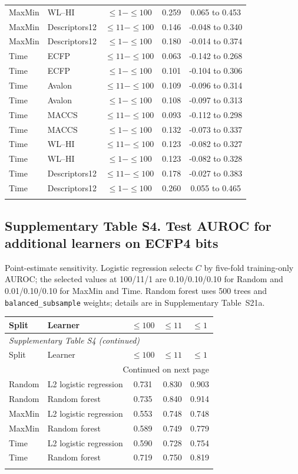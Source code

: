 \begin{longtable}{llccc}
MaxMin & WL--HI & $\leq1-\leq100$ & 0.259 & 0.065 to 0.453 \\
MaxMin & Descriptors12 & $\leq11-\leq100$ & 0.146 & -0.048 to 0.340 \\
MaxMin & Descriptors12 & $\leq1-\leq100$ & 0.180 & -0.014 to 0.374 \\
\addlinespace
Time & ECFP & $\leq11-\leq100$ & 0.063 & -0.142 to 0.268 \\
Time & ECFP & $\leq1-\leq100$ & 0.101 & -0.104 to 0.306 \\
Time & Avalon & $\leq11-\leq100$ & 0.109 & -0.096 to 0.314 \\
Time & Avalon & $\leq1-\leq100$ & 0.108 & -0.097 to 0.313 \\
Time & MACCS & $\leq11-\leq100$ & 0.093 & -0.112 to 0.298 \\
Time & MACCS & $\leq1-\leq100$ & 0.132 & -0.073 to 0.337 \\
Time & WL--HI & $\leq11-\leq100$ & 0.123 & -0.082 to 0.327 \\
Time & WL--HI & $\leq1-\leq100$ & 0.123 & -0.082 to 0.328 \\
Time & Descriptors12 & $\leq11-\leq100$ & 0.178 & -0.027 to 0.383 \\
Time & Descriptors12 & $\leq1-\leq100$ & 0.260 & 0.055 to 0.465 \\
\addlinespace
\end{longtable}
\subsection*{Supplementary Table S4. Test AUROC for additional learners on ECFP4 bits}
Point-estimate sensitivity. Logistic regression selects $C$ by five-fold training-only AUROC; the selected values at 100/11/1 are 0.10/0.10/0.10 for Random and 0.01/0.10/0.10 for MaxMin and Time. Random forest uses 500 trees and \texttt{balanced\_subsample} weights; details are in Supplementary Table~S21a.
\begin{longtable}{llccc}

\toprule Split & Learner & $\leq100$ & $\leq11$ & $\leq1$ \\ \midrule\endfirsthead
\multicolumn{5}{l}{\textit{Supplementary Table S4 (continued)}} \\
\toprule Split & Learner & $\leq100$ & $\leq11$ & $\leq1$ \\ \midrule\endhead
\midrule\multicolumn{5}{r}{Continued on next page}\\\endfoot
\bottomrule\endlastfoot
Random & L2 logistic regression & 0.731 & 0.830 & 0.903 \\
Random & Random forest & 0.735 & 0.840 & 0.914 \\
\addlinespace
MaxMin & L2 logistic regression & 0.553 & 0.748 & 0.748 \\
MaxMin & Random forest & 0.589 & 0.749 & 0.779 \\
\addlinespace
Time & L2 logistic regression & 0.590 & 0.728 & 0.754 \\
Time & Random forest & 0.719 & 0.750 & 0.819 \\
\addlinespace
\end{longtable}
